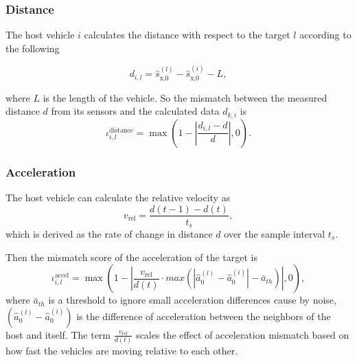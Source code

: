 \documentclass[letterpaper, 10pt, conference]{ieeeconf}  %
\newtheorem{remark}{\it Remark}%
\begin{document}
\subsubsection{Distance}
The host vehicle $i$ calculates the distance with respect to the target $l$ according to the following 

\begin{equation*}
    d_{i,l} = \hat{s}_{\text{x,}0}^{(l)} - \hat{s}_{\text{x,}0}^{(i)} - L,
\end{equation*} 

where $L$ is the length of the vehicle. 
So the mismatch between the measured distance $d$ from its sensors and the calculated data $d_{k,i}$ is 
\begin{equation}
    \iota_{i,l}^{\text{distance}} = \max\left(1 - \left|\frac{d_{i,l} - d}{d}\right|, 0\right).
\end{equation}


\subsubsection{Acceleration}
The host vehicle can calculate the relative velocity as 
\begin{equation}
    v_\text{rel} = \dfrac{d(t-1) - d(t)}{t_s},
\end{equation}
 which is derived as the rate of change in distance $d$ over the sample interval $t_s$.

 Then the mismatch score of the acceleration of the target is 
\begin{equation}
   \iota_{i,l}^{\text{accel}} = \max\left(1 - \left|\frac{v_\text{rel}}{d(t)} \cdot max\left(\left|\hat{a}_0^{(l)} - \hat{a}_0^{(i)} \right| - \bar{a}_{th}\right) \right|, 0\right),
\end{equation}
where $\bar{a}_{th}$ is a threshold to ignore small acceleration differences cause by noise, $\left(\hat{a}_0^{(l)} - \hat{a}_0^{(i)}\right)$ is the difference of acceleration between the neighbors of the host and itself.  
The term $\frac{v_\text{rel}}{d(t)}$ scales the effect of acceleration mismatch based on how fast the vehicles are moving relative to each other.
\end{document}
